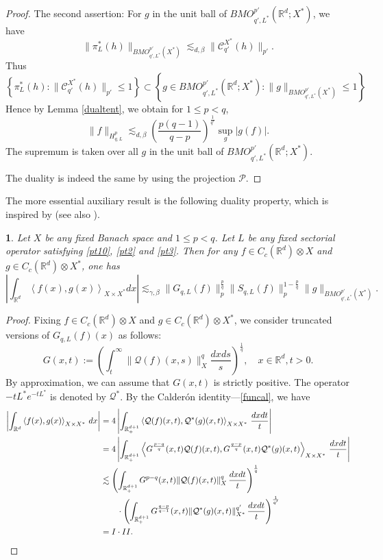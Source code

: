 \documentclass[oneside,english,a4wide]{amsart}
\numberwithin{equation}{section}
\numberwithin{figure}{section}
\theoremstyle{plain}
\theoremstyle{plain}
\newtheorem{prop}[thm]{\protect\propositionname}
\theoremstyle{definition}
\theoremstyle{plain}
\theoremstyle{remark}
\theoremstyle{definition}
\theoremstyle{remark}
\theoremstyle{definition}
\providecommand{\propositionname}{Proposition}
\newcommand{\real}{{\mathbb R}}
\newcommand{\Q}{{\mathcal Q}}
\newcommand{\ot}{\otimes}
\newcommand{\8}{+\infty}
\renewcommand{\1}{\mathbbm{1}}
\newcommand\jdz[1]{ \left| #1 \right| }
\newcommand\sk[1]{ \left( #1 \right) }
\newcommand\lk[1]{ \left\{ #1 \right\} }
\newcommand{\lara}[1]{\left\langle #1 \right\rangle}
\renewcommand\d{{\rm d}}
\begin{document}
{\begin{proof}
{The second assertion: For $g$ in the unit ball of $BMO^{p'}_{q', L^*}(\real^d; X^*)$, we have
\[
    \| \pi_L^*(h) \|_{BMO^{p'}_{q', L^*}(X^*)} \lesssim_{d, \beta} \| \mathcal{C}_{q'}^{X^*}(h) \|_{p'}.
\] 
Thus
\[
    \lk{ \pi_L^*(h) : \| \mathcal{C}_{q'}^{X^*}(h) \|_{p'} \leq 1 } \subset \lk{ g \in BMO^{p'}_{q', L^*}(\real^d; X^*) : \| g \|_{BMO^{p'}_{q', L^*}(X^*)} \leq 1 }
\]
Hence by Lemma \ref{dualtent}, we obtain for $1 \leq p < q$,
\[
    \| f \|_{H^p_{q, L}} \lesssim_{d, \beta}\sk{\frac{p(q-1)}{q-p}}^{\frac{1}{q'}} \sup_g|g(f)|.
\]
The supremum is taken over all $g$ in the unit ball of $BMO^{p'}_{q', L^*}(\real^d; X^*)$.

The duality is indeed the same by using the projection $\mathcal{P}$.
}
\end{proof}
\fi

The more essential auxiliary result  is the following duality property, which is inspired by \cite[Theorem 2.4]{Mei2007} (see also \cite{Xia2016,Xu2022}).

\begin{prop}\label{GSB}
Let $X$ be any fixed Banach space and $1 \leq p < q$. Let $L$ be any fixed sectorial operator satisfying \eqref{pt10}, \eqref{pt2} and \eqref{pt3}. Then for any $f \in C_c(\real^d) \ot X$ and $g \in C_c(\real^d) \ot X^*$, one has
\begin{equation}\label{5.3}
    \jdz{ \int_{\real^d} \lara{f(x), g(x)}_{X \times X^*}dx }  \lesssim_{\gamma,\beta} \| G_{q,L}(f) \|_p^{\frac{p}{q}}\| S_{q,L}(f) \|_{p}^{1-\frac{p}{q}}\| g \|_{BMO^{p'}_{q', L^*}(X^*)}.
\end{equation}
\end{prop}

\begin{proof}   
Fixing $ f \in C_c(\real^d) \ot X $ and $ g \in C_c(\real^d) \ot X^* $, we consider truncated versions of $ G_{q,L}(f)(x) $ as follows:
\[
    G(x,t) := \sk{ \int_{t}^{\infty} \|\Q(f)(x, s)\|_X^q \frac{dxds}{s} }^{\frac{1}{q}},\quad x \in \real^d,t>0.
\]
By approximation, we can assume that $ G(x,t)$ is strictly positive. The operator $-tL^*e^{-tL^*}$ is denoted by $\Q^*$. By the Calder\'on identity---\eqref{funcal}, we have
\begin{align*}
   \jdz{ \int_{\real^d} \lara{f(x), g(x)}_{X \times X^*}\, \d x } & = 4 \jdz{\int_{\real^{d+1}_+} \lara{ \Q(f)(x, t), \Q^*(g)(x, t) }_{X \times X^*}\,\frac{\d x\d t}{t} } \\
   & = 4 \jdz{\int_{\real^{d+1}_+} \lara{ G^{\frac{p-q}{q}}(x,t)\Q(f)(x, t), G^{\frac{q-p}{q}}(x,t)\Q^*(g)(x, t) }_{X \times X^*}\,\frac{\d x\d t}{t}} \\
   & \lesssim \sk{ \int_{\real^{d+1}_+}G^{p-q}(x,t)\| \Q(f)(x, t) \|_X^q \,\frac{\d x\d t}{t} }^{\frac{1}{q}} \\
   & \qquad \cdot\sk{\int_{\real^{d+1}_+} G^{\frac{q-p}{q-1}}(x,t)\| \Q^*(g)(x, t) \|_{X^*}^{q'}\,\frac{\d x\d t}{t}}^{\frac{1}{q'}} \\
   & = I\cdot II.
\end{align*}


\end{proof}}
\end{document}
